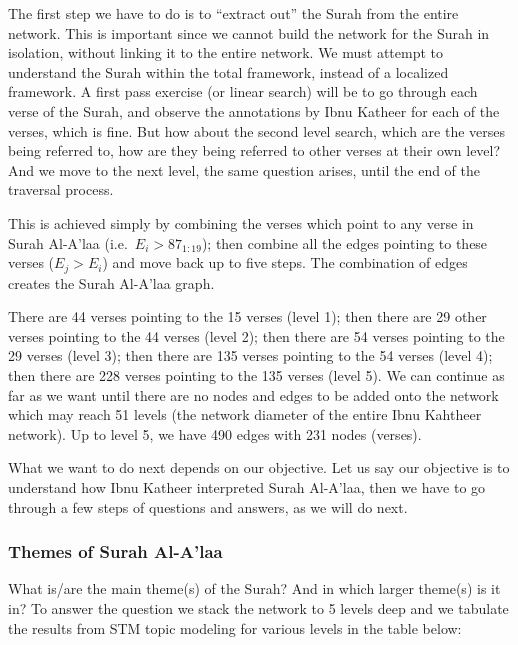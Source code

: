 \documentclass[
]{article}
\begin{document}
The first step we have to do is to ``extract out'' the Surah from the entire network. This is important since we cannot build the network for the Surah in isolation, without linking it to the entire network. We must attempt to understand the Surah within the total framework, instead of a localized framework. A first pass exercise (or linear search) will be to go through each verse of the Surah, and observe the annotations by Ibnu Katheer for each of the verses, which is fine. But how about the second level search, which are the verses being referred to, how are they being referred to other verses at their own level? And we move to the next level, the same question arises, until the end of the traversal process.

This is achieved simply by combining the verses which point to any verse in Surah Al-A'laa (i.e.~\(E_i > 87_{1:19}\)); then combine all the edges pointing to these verses (\(E_j > E_i\)) and move back up to five steps. The combination of edges creates the Surah Al-A'laa graph.

There are 44 verses pointing to the 15 verses (level 1); then there are 29 other verses pointing to the 44 verses (level 2); then there are 54 verses pointing to the 29 verses (level 3); then there are 135 verses pointing to the 54 verses (level 4); then there are 228 verses pointing to the 135 verses (level 5). We can continue as far as we want until there are no nodes and edges to be added onto the network which may reach 51 levels (the network diameter of the entire Ibnu Kahtheer network). Up to level 5, we have 490 edges with 231 nodes (verses).

What we want to do next depends on our objective. Let us say our objective is to understand how Ibnu Katheer interpreted Surah Al-A'laa, then we have to go through a few steps of questions and answers, as we will do next.

\hypertarget{themes-of-surah-al-alaa}{%
\subsubsection{Themes of Surah Al-A'laa}\label{themes-of-surah-al-alaa}}

What is/are the main theme(s) of the Surah? And in which larger theme(s) is it in? To answer the question we stack the network to 5 levels deep and we tabulate the results from STM topic modeling for various levels in the table below:
\end{document}
